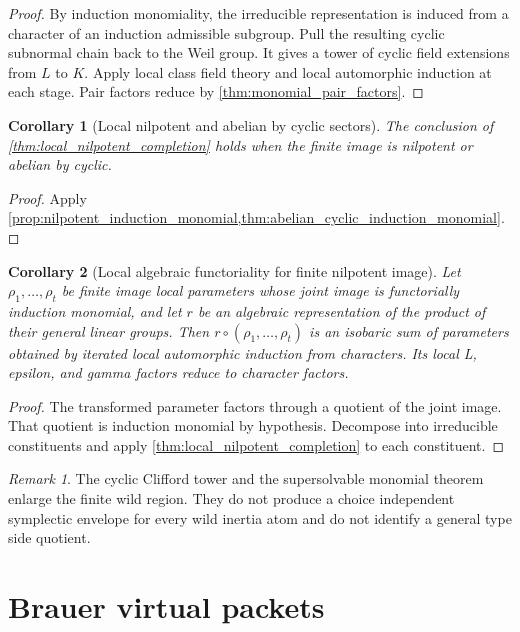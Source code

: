 \documentclass{aomart}
\newtheorem{corollary}[corollary]{Corollary}
\theoremstyle{definition}
\theoremstyle{remark}
\newtheorem{remark}[remark]{Remark}
\begin{document}
\begin{proof}
By induction monomiality, the irreducible representation is induced from a character of an induction admissible subgroup. Pull the resulting cyclic subnormal chain back to the Weil group. It gives a tower of cyclic field extensions from \(L\) to \(K\). Apply local class field theory and local automorphic induction at each stage. Pair factors reduce by \cref{thm:monomial_pair_factors}.
\end{proof}

\begin{corollary}[Local nilpotent and abelian by cyclic sectors]\label{cor:local_group_classes}
The conclusion of \cref{thm:local_nilpotent_completion} holds when the finite image is nilpotent or abelian by cyclic.
\end{corollary}

\begin{proof}
Apply \cref{prop:nilpotent_induction_monomial,thm:abelian_cyclic_induction_monomial}.
\end{proof}

\begin{corollary}[Local algebraic functoriality for finite nilpotent image]\label{cor:local_nilpotent_functoriality}
Let \(\rho_1,\ldots,\rho_t\) be finite image local parameters whose joint image is functorially induction monomial, and let \(r\) be an algebraic representation of the product of their general linear groups. Then \(r\circ(\rho_1,\ldots,\rho_t)\) is an isobaric sum of parameters obtained by iterated local automorphic induction from characters. Its local L, epsilon, and gamma factors reduce to character factors.
\end{corollary}

\begin{proof}
The transformed parameter factors through a quotient of the joint image. That quotient is induction monomial by hypothesis. Decompose into irreducible constituents and apply \cref{thm:local_nilpotent_completion} to each constituent.
\end{proof}

\begin{remark}\label{rem:wild_boundary}
The cyclic Clifford tower and the supersolvable monomial theorem enlarge the finite wild region. They do not produce a choice independent symplectic envelope for every wild inertia atom and do not identify a general type side quotient.
\end{remark}


\section{Brauer virtual packets}\label{sec:brauer}
\end{document}
